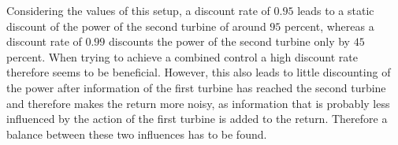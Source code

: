 Considering the values of this setup, a discount rate of $0.95$ leads to a static discount of the power of the second turbine of around $95$ percent, whereas a discount rate of $0.99$ discounts the power of the second turbine only by $45$ percent. When trying to achieve a combined control a high discount rate therefore seems to be beneficial. However, this also leads to little discounting of the power after information of the first turbine has reached the second turbine and therefore makes the return more noisy, as information that is probably less influenced by the action of the first turbine is added to the return. Therefore a balance between these two influences has to be found.


